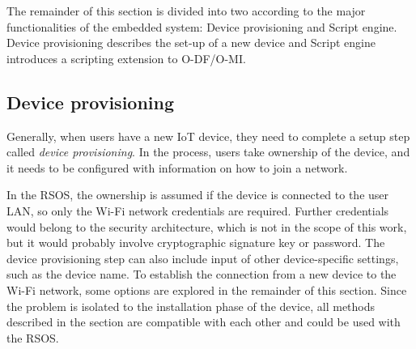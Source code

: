 The remainder of this section is divided into two according to the major functionalities of the embedded system: Device provisioning and Script engine. Device provisioning describes the set-up of a new device and Script engine introduces a scripting extension to O-DF/O-MI.


%

\subsection{Device provisioning}

Generally, when users have a new IoT device, they need to complete a setup step called \emph{device provisioning}. In the process, users take ownership of the device, and it needs to be configured with information on how to join a network.

In the RSOS, the ownership is assumed if the device is connected to the user LAN, so only the Wi-Fi network credentials are required. Further credentials would belong to the security architecture, which is not in the scope of this work, but it would probably involve cryptographic signature key or password. The device provisioning step can also include input of other device-specific settings, such as the device name. To establish the connection from a new device to the Wi-Fi network, some options are explored in the remainder of this section. Since the problem is isolated to the installation phase of the device, all methods described in the section are compatible with each other and could be used with the RSOS.

